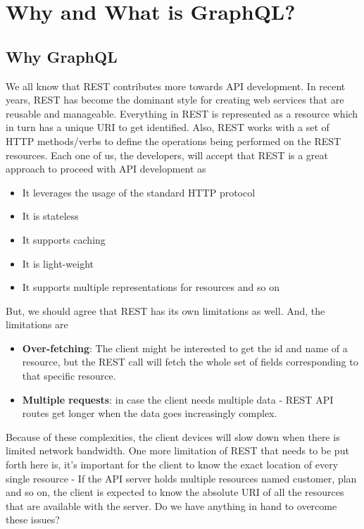 \documentclass[../main.tex]{subfiles}
\begin{document}
\chapter{Why and What is GraphQL?}
\section{Why GraphQL}
We all know that REST contributes more towards API development.
In recent years, REST has become the dominant style for creating web services that are reusable and manageable.
Everything in REST is represented as a resource which in turn has a unique URI to get identified.
Also, REST works with a set of HTTP methods/verbs to define the operations being performed on the REST resources.
Each one of us, the developers, will accept that REST is a great approach to proceed with API development as 

\begin{itemize}
  \item {It leverages the usage of the standard HTTP protocol}
  \item {It is stateless}
  \item {It supports caching}
  \item {It is light-weight}
  \item {It supports multiple representations for resources and so on}
\end{itemize}
But, we should agree that REST has its own limitations as well. And, the limitations are

\begin{itemize}
  \item {\textbf{Over-fetching}: The client might be interested to get the id and name of a resource,
    but the REST call will fetch the whole set of fields corresponding to that specific resource.}
  \item {\textbf{Multiple requests}: in case the client needs multiple data - REST API routes get longer when the data goes increasingly complex.}
\end{itemize}
Because of these complexities, the client devices will slow down when there is limited network bandwidth.
One more limitation of REST that needs to be put forth here is,
it's important for the client to know the exact location of every single resource -
If the API server holds multiple resources named customer, plan and so on, the client is expected to know the absolute URI of all the resources that are available with the server.
Do we have anything in hand to overcome these issues?
\end{document}
